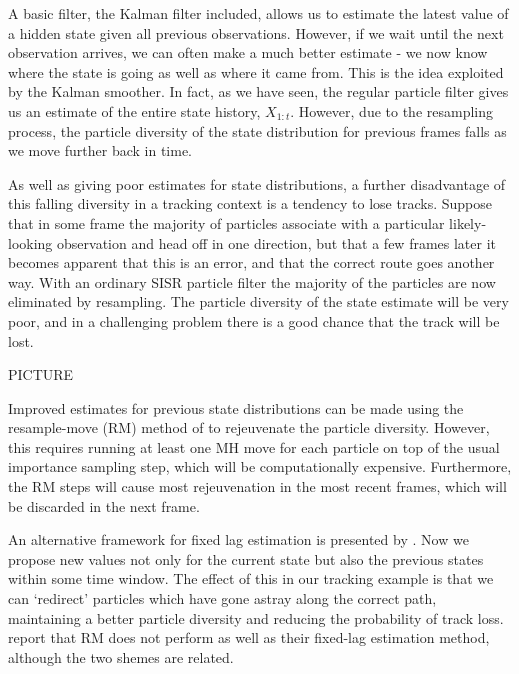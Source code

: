 A basic filter, the Kalman filter included, allows us to estimate the latest value of a hidden state given all previous observations. However, if we wait until the next observation arrives, we can often make a much better estimate - we now know where the state is going as well as where it came from. This is the idea exploited by the Kalman smoother. In fact, as we have seen, the regular particle filter gives us an estimate of the entire state history, $X_{1:t}$. However, due to the resampling process, the particle diversity of the state distribution for previous frames falls as we move further back in time.

As well as giving poor estimates for state distributions, a further disadvantage of this falling diversity in a tracking context is a tendency to lose tracks. Suppose that in some frame the majority of particles associate with a particular likely-looking observation and head off in one direction, but that a few frames later it becomes apparent that this is an error, and that the correct route goes another way. With an ordinary SISR particle filter the majority of the particles are now eliminated by resampling. The particle diversity of the state estimate will be very poor, and in a challenging problem there is a good chance that the track will be lost.

PICTURE

Improved estimates for previous state distributions can be made using the resample-move (RM) method of \cite{Gilks2001} to rejeuvenate the particle diversity. However, this requires running at least one MH move for each particle on top of the usual importance sampling step, which will be computationally expensive. Furthermore, the RM steps will cause most rejeuvenation in the most recent frames, which will be discarded in the next frame.

An alternative framework for fixed lag estimation is presented by \cite{Doucet2006}. Now we propose new values not only for the current state but also the previous states within some time window. The effect of this in our tracking example is that we can `redirect' particles which have gone astray along the correct path, maintaining a better particle diversity and reducing the probability of track loss. \cite{Doucet2006} report that RM does not perform as well as their fixed-lag estimation method, although the two shemes are related.